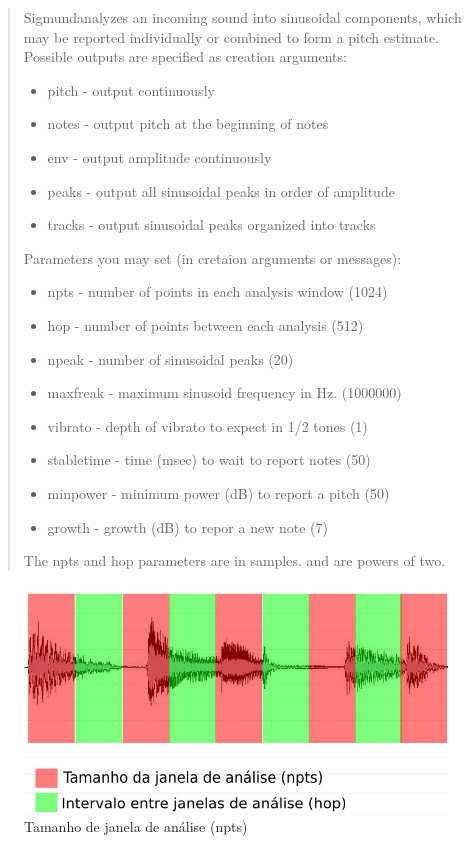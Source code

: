 \documentclass[draft]{ppgmus}
\begin{document}
\begin{quote}
{ Sigmund\texttildelow analyzes an incoming sound into sinusoidal
components, which may be reported individually or combined to
form a pitch estimate. Possible outputs are specified as creation
arguments:

\begin{itemize}
 \item pitch - output continuously
 \item notes - output pitch at the beginning of notes
 \item env - output amplitude continuously
 \item peaks - output all sinusoidal peaks in order of amplitude
 \item tracks - output sinusoidal peaks organized into tracks
\end{itemize}
Parameters you may set (in cretaion arguments or messages):

\begin{itemize}
 \item npts - number of points in each analysis window (1024)
 \item hop - number of points between each analysis (512)
 \item npeak - number of sinusoidal peaks (20)
 \item maxfreak - maximum sinusoid frequency in Hz. (1000000)
 \item vibrato - depth of vibrato to expect in 1/2 tones (1)
 \item stabletime - time (msec) to wait to report notes (50)
 \item minpower - minimum power (dB) to report a pitch (50)
 \item growth - growth (dB) to repor a new note (7) 
\end{itemize}
The npts and hop parameters are in samples. and are powers of two.}
\end{quote} 


\begin{figure}
\includegraphics[scale=.7]{sigmund}
\caption{Tamanho de janela de análise (npts)}
\label{janela-analise}
\end{figure}
\end{document}
